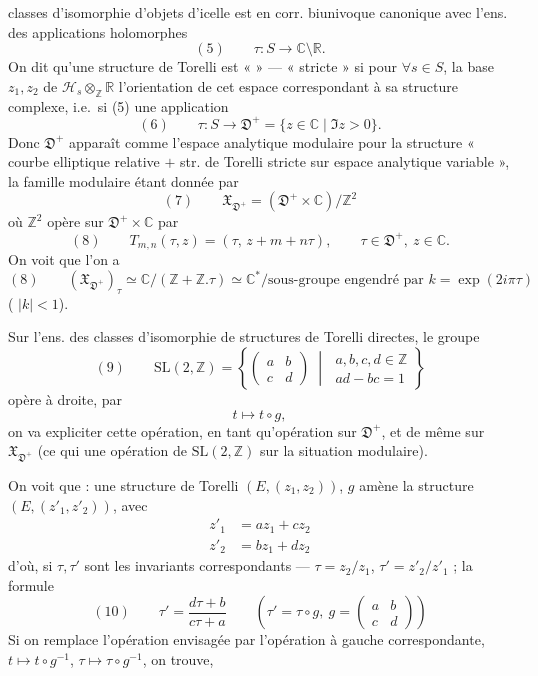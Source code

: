\documentclass[11pt,a4paper]{article}
\begin{document}
classes d'isomorphie d'objets d'icelle est en corr. biunivoque canonique avec
l'ens. des applications holomorphes
\[
(5)\qquad \tau : S \longrightarrow \mathbb{C} \setminus \mathbb{R} .
\]
On dit qu'une structure de Torelli est «  » --- « stricte » si
\struck{\ill{}} pour $\forall s \in S$, la base $z_1, z_2$ de
$\mathcal{H}_s \otimes_{\mathbb{Z}} \mathbb{R}$  
l'orientation de cet espace correspondant à sa structure complexe, i.e.\ si (5)
\ill{} une application
\[
(6)\qquad \tau : S \longrightarrow \mathfrak{D}^+ = \{ z \in \mathbb{C} \mid \Im z > 0 \}.
\]
Donc $\mathfrak{D}^+$ apparaît comme l'espace analytique modulaire pour la
structure « courbe elliptique relative $+$ str. de Torelli stricte sur espace
analytique variable », la famille modulaire étant donnée par
\[
(7)\qquad \mathfrak{X}_{\mathfrak{D}^+} = (\mathfrak{D}^+ \times \mathbb{C}) / \mathbb{Z}^2
\]
où $\mathbb{Z}^2$ opère sur $\mathfrak{D}^+ \times \mathbb{C}$ par
\[
(8)\qquad T_{m,n}(\tau, z) = (\tau,\, z + m + n\tau), \qquad
\tau \in \mathfrak{D}^+,\ z \in \mathbb{C} .
\]
On voit que l'on a
\[
(8)\qquad (\mathfrak{X}_{\mathfrak{D}^+})_\tau \simeq \mathbb{C}/(\mathbb{Z} + \mathbb{Z}.\tau)
\simeq \mathbb{C}^* / \text{sous-groupe engendré par } k = \exp(2i\pi\tau)
\]
( $|k| < 1$).

Sur l'ens. des  classes d'isomorphie de structures de Torelli
directes, le groupe \struck{\ill{}}
\[
(9)\qquad \mathrm{SL}(2,\mathbb{Z}) = \left\{ \begin{pmatrix} a & b \\ c & d \end{pmatrix}
\;\middle|\; \begin{array}{l} a,b,c,d \in \mathbb{Z} \\ ad - bc = 1 \end{array} \right\}
\]
opère à droite, par
\[
t \longmapsto t \circ g ,
\]
on va expliciter cette opération, en tant qu'opération sur $\mathfrak{D}^+$, et
de même sur $\mathfrak{X}_{\mathfrak{D}^+}$ (ce qui  une opération de
$\mathrm{SL}(2,\mathbb{Z})$ sur la situation modulaire).

On voit que : une structure de Torelli $(E, (z_1, z_2))$, $g$ amène la
structure $(E, (z'_1, z'_2))$, avec
\[
\begin{aligned}
z'_1 &= a z_1 + c z_2 \\
z'_2 &= b z_1 + d z_2
\end{aligned}
\]
d'où, si $\tau, \tau'$ sont les invariants correspondants ---
$\tau = z_2/z_1$, $\tau' = z'_2/z'_1$ ; la formule
\[
(10)\qquad \tau' = \frac{d\tau + b}{c\tau + a}
\qquad \left(\tau' = \tau \circ g,\ g = \begin{pmatrix} a & b \\ c & d \end{pmatrix}\right)
\]
Si on remplace l'opération envisagée par l'opération à gauche
correspondante, \struck{\ill{}}
$t \longmapsto t \circ g^{-1}$, \ill{} $\tau \longmapsto \tau \circ g^{-1}$,
on trouve,
\end{document}

